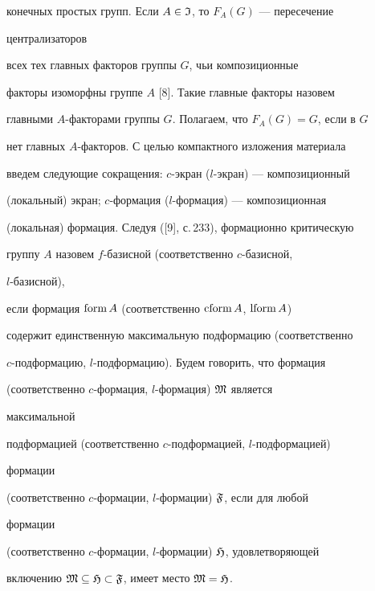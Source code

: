 конечных простых групп. Если $A\in\frak I$, то $F_A(G)$ --- пересечение 


централизаторов 


всех тех главных факторов группы $G$, чьи композиционные 


факторы изоморфны группе $A$ [8]. Такие главные факторы назовем 


главными $A$-факторами группы $G$. Полагаем, что $F_A(G)=G$, если в $G$ 


нет главных $A$-факторов. С целью компактного изложения материала 


введем следующие сокращения: $c$-экран ($l$-экран) --- композиционный 


(локальный) экран; $c$-формация ($l$-формация) --- композиционная 


(локальная) формация. Следуя ([9], с.\,233), формационно критическую 


группу $A$ назовем $f$-базисной (соответственно $c$-базисной, 


$l$-базисной), 


если формация $\operatorname{form} A$ (соответственно $\operatorname{cform} A$, $\operatorname{lform} A$) 


содержит единственную максимальную подформацию (соответственно 


$c$-подформацию, $l$-подформацию). Будем говорить, что формация 


(соответственно $c$-формация, $l$-формация) $\frak M$ является 


максимальной 


подформацией (соответственно $c$-подформацией, $l$-подформацией) 


формации 


(соответственно $c$-формации, $l$-формации) $\frak F$, если для любой 


формации 


(соответственно $c$-формации, $l$-формации) $\frak H$, удовлетворяющей 


включению $\frak M\subseteq\frak H\subset\frak F$, имеет место $\frak 


M=\frak H$. 


 


